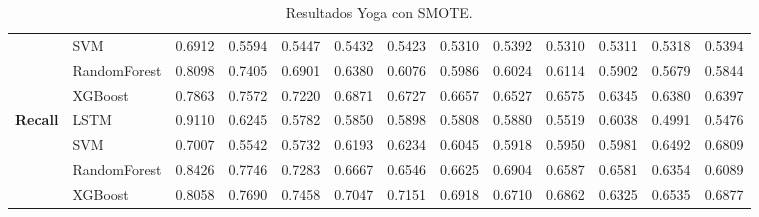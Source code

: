 \begin{table}[h]
\begin{adjustbox}{max width=15cm}
\begin{tabular}{|c|l|r|r|r|r|r|r|r|r|r|r|r|}
			& SVM &  0.6912 &  0.5594 &  0.5447 &  0.5432 &  0.5423 &  0.5310 &  0.5392 &  0.5310 &  0.5311 &  0.5318 &  0.5394 \\
			& RandomForest &  0.8098 &  0.7405 &  0.6901 &  0.6380 &  0.6076 &  0.5986 &  0.6024 &  0.6114 &  0.5902 &  0.5679 &  0.5844 \\
			& XGBoost &  0.7863 &  0.7572 &  0.7220 &  0.6871 &  0.6727 &  0.6657 &  0.6527 &  0.6575 &  0.6345 &  0.6380 &  0.6397 \\
			\hline
			\textbf{Recall} & LSTM &  0.9110 &  0.6245 &  0.5782 &  0.5850 &  0.5898 &  0.5808 &  0.5880 &  0.5519 &  0.6038 &  0.4991 &  0.5476 \\
			& SVM &  0.7007 &  0.5542 &  0.5732 &  0.6193 &  0.6234 &  0.6045 &  0.5918 &  0.5950 &  0.5981 &  0.6492 &  0.6809 \\
			& RandomForest &  0.8426 &  0.7746 &  0.7283 &  0.6667 &  0.6546 &  0.6625 &  0.6904 &  0.6587 &  0.6581 &  0.6354 &  0.6089 \\
			& XGBoost &  0.8058 &  0.7690 &  0.7458 &  0.7047 &  0.7151 &  0.6918 &  0.6710 &  0.6862 &  0.6325 &  0.6535 &  0.6877 \\
			\hline
		\end{tabular}
	\end{adjustbox}
	\caption{Resultados Yoga con SMOTE.}
	\label{tab:Yoga_SMOTE}
\end{table}
\newpage
